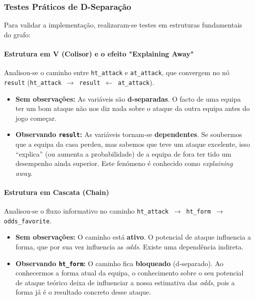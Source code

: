 \documentclass[10pt]{article}
\begin{document}
\subsubsection{Testes Práticos de D-Separação}

Para validar a implementação, realizaram-se testes em estruturas fundamentais do grafo:

\paragraph{Estrutura em V (Colisor) e o efeito "Explaining Away"}
Analisou-se o caminho entre \texttt{ht\_attack} e \texttt{at\_attack}, que convergem no nó \texttt{result} (\texttt{ht\_attack $\rightarrow$ result $\leftarrow$ at\_attack}).
\begin{itemize}
    \item \textbf{Sem observações:} As variáveis são \textbf{d-separadas}. O facto de uma equipa ter um bom ataque não nos diz nada sobre o ataque da outra equipa antes do jogo começar.
    \item \textbf{Observando \texttt{result}:} As variáveis tornam-se \textbf{dependentes}. Se soubermos que a equipa da casa perdeu, mas sabemos que teve um ataque excelente, isso ``explica'' (ou aumenta a probabilidade) de a equipa de fora ter tido um desempenho ainda superior. Este fenómeno é conhecido como \textit{explaining away}.
\end{itemize}

\paragraph{Estrutura em Cascata (Chain)}
Analisou-se o fluxo informativo no caminho \texttt{ht\_attack $\rightarrow$ ht\_form $\rightarrow$ odds\_favorite}.
\begin{itemize}
    \item \textbf{Sem observações:} O caminho está \textbf{ativo}. O potencial de ataque influencia a forma, que por sua vez influencia as \textit{odds}. Existe uma dependência indireta.
    \item \textbf{Observando \texttt{ht\_form}:} O caminho fica \textbf{bloqueado} (d-separado). Ao conhecermos a forma atual da equipa, o conhecimento sobre o seu potencial de ataque teórico deixa de influenciar a nossa estimativa das \textit{odds}, pois a forma já é o resultado concreto desse ataque.
\end{itemize}
\end{document}
